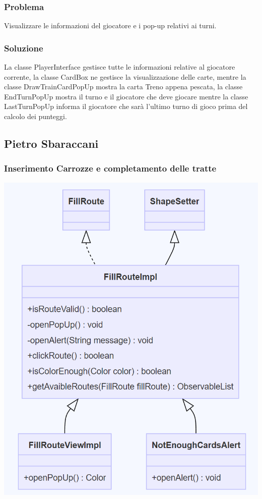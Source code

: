 \documentclass[a4paper,12pt]{report}
\begin{document}
\subsubsection{Problema}
%
Visualizzare le informazioni del giocatore e i pop-up relativi ai turni.
%
\subsubsection{Soluzione} 
%
La classe PlayerInterface gestisce tutte le informazioni relative al giocatore corrente, la classe CardBox ne gestisce la visualizzazione delle carte, mentre la classe DrawTrainCardPopUp mostra la carta Treno appena pescata, la classe EndTurnPopUp mostra il turno e il giocatore che deve giocare mentre la classe LastTurnPopUp informa il giocatore che sarà l'ultimo turno di gioco prima del calcolo dei punteggi.

\newpage
\subsection{Pietro Sbaraccani}
\subsubsection{Inserimento Carrozze e completamento delle tratte}
\begin{center}
\includegraphics[scale=0.5]{fillroutecontrollerUML (1).png}
\end{center}
%
\end{document}
